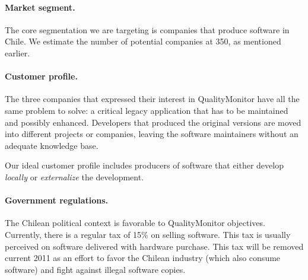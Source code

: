 \documentclass[runningheads]{llncs}
\begin{document}
\paragraph{Market segment. } The core segmentation we are targeting is companies that produce software in Chile. We estimate the number of potential companies at 350, as mentioned earlier. 




\paragraph{Customer profile.} The three companies that expressed their interest in QualityMonitor have all the same problem to solve: a critical legacy application that has to be maintained and possibly enhanced. Developers that produced the original versions are moved into different projects or companies, leaving the software maintainers without an adequate knowledge base. 

Our ideal customer profile includes producers of software that either develop \emph{locally} or \emph{externalize} the development. 

\paragraph{Government regulations.} The Chilean political context is favorable to QualityMonitor objectives.
Currently, there is a regular tax of 15\% on selling software. This tax is usually perceived on software delivered with hardware purchase. This tax will be removed current 2011 as an effort to favor the Chilean industry (which also consume software) and fight against illegal software copies.
\end{document}

